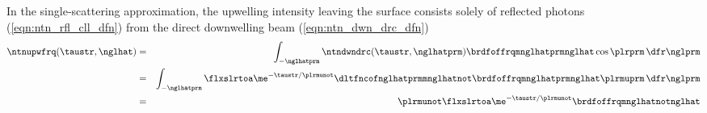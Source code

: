 \documentclass[12pt]{article}
\begin{document}
In the single-scattering approximation, the upwelling intensity
leaving the surface consists solely of reflected photons
(\ref{eqn:ntn_rfl_cll_dfn}) from the direct downwelling beam
(\ref{eqn:ntn_dwn_drc_dfn}) 
\begin{eqnarray}
\ntnupwfrq(\taustr,\nglhat) 
& = & \int_{-\nglhatprm} 
\ntndwndrc(\taustr,\nglhatprm) \brdfoffrqmnglhatprmnglhat 
\cos \plrprm \,\dfr\nglprm \nonumber \\
& = & \int_{-\nglhatprm} 
\flxslrtoa \me^{-\taustr/\plrmunot} \dltfncofnglhatprmmnglhatnot
\brdfoffrqmnglhatprmnglhat \plrmuprm \,\dfr\nglprm \nonumber \\
& = & 
\plrmunot \flxslrtoa \me^{-\taustr/\plrmunot} 
\brdfoffrqmnglhatnotnglhat
\label{eqn:ntn_rfl_sfc_dfn}
\end{eqnarray}
\end{document}

